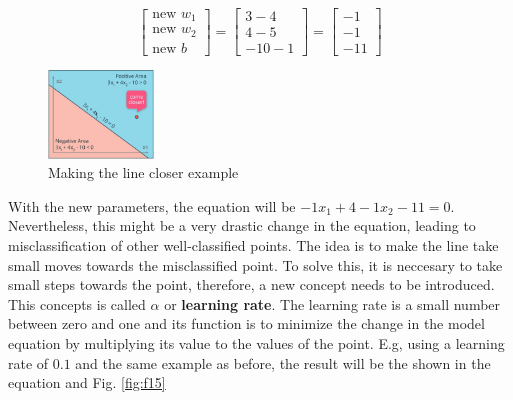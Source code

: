 \documentclass{article}
\begin{document}
\[
\begin{bmatrix}  \text{new } w_1 \\
                 \text{new } w_2 \\
                \text{new } b \end{bmatrix} = \begin{bmatrix}
                                    3 - 4 \\
                                    4 - 5 \\
                                    -10 - 1
                                    \end{bmatrix} = \begin{bmatrix}
                                                    -1 \\
                                                    -1 \\
                                                    -11
                                                    \end{bmatrix}
\]

\begin{figure}[ht]
    \centering
    \includegraphics[width=0.25\textwidth,height=0.25\textheight,keepaspectratio]{images/moving_line.png}
    \captionsetup{justification=centering}
    \caption{Making the line closer example}
    \label{fig:f14}
\end{figure}

With the new parameters, the equation will be \(-1x_1+ 4-1x_2 - 11 = 0\). Nevertheless, this might be a very drastic change in the equation, leading to misclassification of other well-classified points. The idea is to make the line take small moves towards the misclassified point. To solve this, it is neccesary to take small steps towards the point, therefore, a new concept needs to be introduced. This concepts is called \(\alpha\) or \textbf{learning rate}. The learning rate is a small number between zero and one and its function is to minimize the change in the model equation by multiplying its value to the values of the point. E.g, using a learning rate of \(0.1\) and the same example as before, the result will be the shown in the equation and Fig. \ref{fig:f15}
\end{document}
